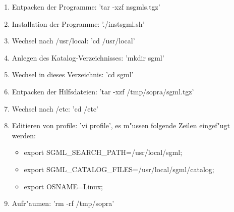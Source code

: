 \begin{enumerate}
\item{Entpacken der Programme: 'tar -xzf nsgmls.tgz'}
\item{Installation der Programme: './instsgml.sh'}
\item{Wechsel nach /usr/local: 'cd /usr/local'}
\item{Anlegen des Katalog-Verzeichnisses: 'mkdir sgml'}
\item{Wechsel in dieses Verzeichnis: 'cd sgml'}
\item{Entpacken der Hilfsdateien: 'tar -xzf /tmp/sopra/sgml.tgz'}
\item{Wechsel nach /etc: 'cd /etc'}
\item{Editieren von profile: 'vi profile', es m"ussen folgende Zeilen
eingef"ugt werden:}
\begin{itemize}
\item{export SGML\_SEARCH\_PATH=/usr/local/sgml;}
\item{export SGML\_CATALOG\_FILES=/usr/local/sgml/catalog;}
\item{export OSNAME=Linux;}
\end{itemize}
\item{Aufr"aumen: 'rm -rf /tmp/sopra'}
\end{enumerate}


